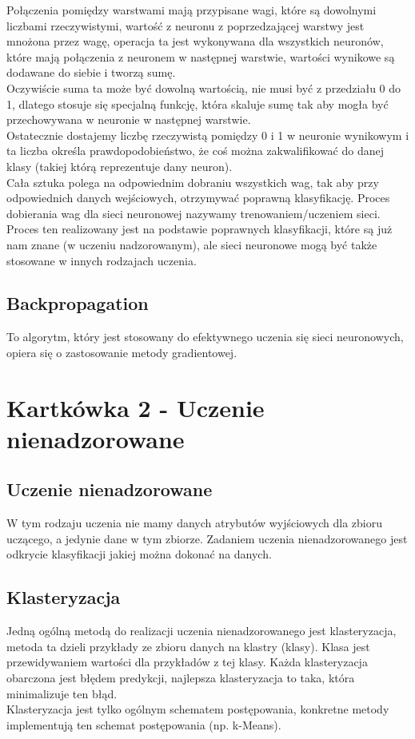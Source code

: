 \documentclass[a4paper,15pt]{article}
\begin{document}
Połączenia pomiędzy warstwami mają przypisane wagi, które są dowolnymi liczbami rzeczywistymi, wartość z neuronu z poprzedzającej warstwy jest mnożona przez wagę, operacja ta jest wykonywana dla wszystkich neuronów, które mają połączenia z neuronem w następnej warstwie, wartości wynikowe są dodawane do siebie i tworzą sumę. \\ 

Oczywiście suma ta może być dowolną wartością, nie musi być z przedziału 0 do 1, dlatego stosuje się specjalną funkcję, która skaluje sumę tak aby mogła być przechowywana w neuronie w następnej warstwie. \\

Ostatecznie dostajemy liczbę rzeczywistą pomiędzy 0 i 1 w neuronie wynikowym i ta liczba określa prawdopodobieństwo, że coś można zakwalifikować do danej klasy (takiej którą reprezentuje dany neuron). \\

Cała sztuka polega na odpowiednim dobraniu wszystkich wag, tak aby przy odpowiednich danych wejściowych, otrzymywać poprawną klasyfikację. Proces dobierania wag dla sieci neuronowej nazywamy trenowaniem/uczeniem sieci. Proces ten realizowany jest na podstawie poprawnych klasyfikacji, które są już nam znane (w uczeniu nadzorowanym), ale sieci neuronowe mogą być także stosowane w innych rodzajach uczenia. \\

\subsection{Backpropagation}

To algorytm, który jest stosowany do efektywnego uczenia się sieci neuronowych, opiera się o zastosowanie metody gradientowej. 

\section{Kartkówka 2 - Uczenie nienadzorowane}

\subsection{Uczenie nienadzorowane}
W tym rodzaju uczenia nie mamy danych atrybutów wyjściowych dla zbioru uczącego, a jedynie dane w tym zbiorze. Zadaniem uczenia nienadzorowanego jest odkrycie klasyfikacji jakiej można dokonać na danych.

\subsection{Klasteryzacja}
Jedną ogólną metodą do realizacji uczenia nienadzorowanego jest klasteryzacja, metoda ta dzieli przykłady ze zbioru danych na klastry (klasy). Klasa jest przewidywaniem wartości dla przykładów z tej klasy. Każda klasteryzacja obarczona jest błędem predykcji, najlepsza klasteryzacja to taka, która minimalizuje ten błąd. \\
Klasteryzacja jest tylko ogólnym schematem postępowania, konkretne metody implementują ten schemat postępowania (np. k-Means).
\end{document}
